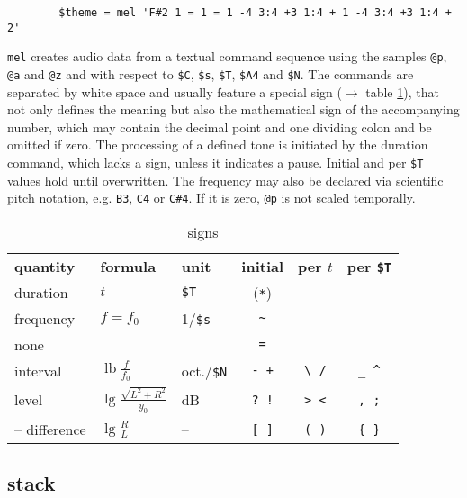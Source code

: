 \documentclass[a4paper, 10pt]{article}
\begin{document}
	\begin{verbatim}
		$theme = mel 'F#2 1 = 1 = 1 -4 3:4 +3 1:4 + 1 -4 3:4 +3 1:4 + 2'
	\end{verbatim}
	\verb|mel| creates audio data from a textual command sequence using the samples \verb|@p|, \verb|@a| and \verb|@z| and with respect to \verb|$C|, \verb|$s|, \verb|$T|, \verb|$A4| and \verb|$N|. The commands are separated by white space and usually feature a special sign ($\rightarrow$ table \ref{signs}), that not only defines the meaning but also the mathematical sign of the accompanying number, which may contain the decimal point and one dividing colon and be omitted if zero. The processing of a defined tone is initiated by the duration command, which lacks a sign, unless it indicates a pause. Initial and per \verb|$T| values hold until overwritten. The frequency may also be declared via scientific pitch notation, e.g. \verb|B3|, \verb|C4| or \verb|C#4|. If it is zero, \verb|@p| is not scaled temporally.
	\begin{table}[H]
		\centering
		\begin{tabular}
			{ l            l                                    l                c               c               c }
			{\bf quantity} & {\bf formula}                      & {\bf unit}     & {\bf initial} & {\bf per $t$} & {\bf per \verb|$T|} \\
			duration       & $t$                                & \verb|$T|      & (\verb|*|)    &               &                     \\
			frequency      & $f = f_0$                          & 1/\verb|$s|    &  \verb|~|     &               &                     \\
			none           &                                    &                &  \verb|=|     &               &                     \\
			interval       & $\operatorname{lb} \frac f {f_0}$  & oct./\verb|$N| & \verb|- +|    & \verb|\ /|    & \verb|_ ^|          \\
			level          & $\lg \frac{\sqrt{L^2 + R^2}}{y_0}$ & dB             & \verb|? !|    & \verb|> <|    & \verb|, ;|          \\
			-- difference  & $\lg \frac R L$                    & --             & \verb|[ ]|    & \verb|( )|    & \verb|{ }|
		\end{tabular}
		\caption{signs}
		\label{signs}
	\end{table}
	
	\subsection*{stack}
	
\end{document}
